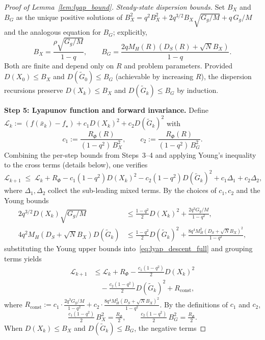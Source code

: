 \documentclass[11pt,a4paper]{article}
\begin{document}
\begin{proof}[Proof of Lemma~\ref{lem:lyap_bound}]
\emph{Steady-state dispersion bounds.}
Set $B_X$ and $B_G$ as the unique positive solutions of
$B_X^2 = q^2 B_X^2 + 2q^{3/2}B_X\sqrt{G_g/M}+q\,G_g/M$
and the analogous equation for $B_G$; explicitly,
\begin{equation}\label{eq:disp_fp}
  B_X
  = \frac{\rho\sqrt{G_g/M}}{1-q},
  \qquad
  B_G
  = \frac{2qM_H(R)(D_S(R)+\sqrt{N}B_X)}{1-q}.
\end{equation}
Both are finite and depend only on $R$ and problem parameters.
Provided $D(X_0)\le B_X$ and $D(\tilde G_0)\le B_G$
(achievable by increasing $R$), the dispersion recursions
preserve $D(X_k)\le B_X$ and $D(\tilde G_k)\le B_G$ by induction.

\smallskip
\noindent\textbf{Step 5: Lyapunov function and forward invariance.}
Define
$\mathcal L_k := (f(\bar x_k)-f_\star) + c_1 D(X_k)^2 + c_2 D(\tilde G_k)^2$
with
\[
  c_1 := \frac{R_\Phi(R)}{(1-q^2)\,B_X^2},
  \qquad
  c_2 := \frac{R_\Phi(R)}{(1-q^2)\,B_G^2}.
\]
Combining the per-step bounds from Steps~3--4 and applying Young's
inequality to the cross terms (details below), one verifies
\begin{equation}\label{eq:lyap_descent_full}
  \mathcal L_{k+1}
  \;\le\;
  \mathcal L_k
  + R_\Phi
  - c_1(1-q^2)D(X_k)^2
  - c_2(1-q^2)D(\tilde G_k)^2
  + c_1\Delta_1 + c_2\Delta_2,
\end{equation}
where $\Delta_1,\Delta_2$ collect the sub-leading mixed terms.
By the choices of $c_1,c_2$ and the Young bounds
\begin{align*}
  2q^{3/2}D(X_k)\sqrt{G_g/M}
  &\le \tfrac{1-q^2}{2}D(X_k)^2 + \tfrac{2q^3 G_g/M}{1-q^2},\\
  4q^2 M_H(D_S{+}\sqrt{N}B_X)D(\tilde G_k)
  &\le \tfrac{1-q^2}{2}D(\tilde G_k)^2
  + \tfrac{8q^4 M_H^2(D_S{+}\sqrt{N}B_X)^2}{1-q^2},
\end{align*}
substituting the Young upper bounds into~\eqref{eq:lyap_descent_full}
and grouping terms yields
\begin{align*}
  \mathcal L_{k+1}
  &\le
  \mathcal L_k + R_\Phi
  - \tfrac{c_1(1{-}q^2)}{2}D(X_k)^2\\
  &\quad- \tfrac{c_2(1{-}q^2)}{2}D(\tilde G_k)^2
  + R_{\mathrm{const}},
\end{align*}
where $R_{\mathrm{const}}:=c_1\!\cdot\!\tfrac{2q^3 G_g/M}{1{-}q^2}
+c_2\!\cdot\!\tfrac{8q^4 M_H^2(D_S{+}\sqrt{N}B_X)^2}{1{-}q^2}$.
By the definitions of $c_1$ and $c_2$,
\[
  \tfrac{c_1(1{-}q^2)}{2}\,B_X^2
  = \tfrac{R_\Phi}{2},
  \qquad
  \tfrac{c_2(1{-}q^2)}{2}\,B_G^2
  = \tfrac{R_\Phi}{2}.
\]
When $D(X_k)\le B_X$ and $D(\tilde G_k)\le B_G$, the negative terms

\end{proof}
\end{document}
